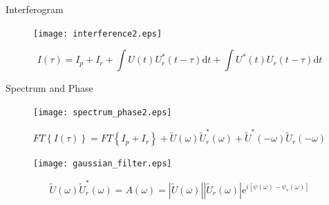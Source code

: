 \documentclass[11pt]{beamer}
\begin{document}
\begin{frame}{Interferogram}
\vspace{-15pt}
\begin{figure}
	\centering
	\texttt{[image: interference2.eps]}
\end{figure}
\vspace{-15pt}
\begin{equation*}
	I(\tau) 	= I_p + I_r + \int U(t)U_r^*(t-\tau)\mathrm{d}t + \int U^*(t)U_r(t-\tau)\mathrm{d}t 
\end{equation*}
\end{frame}

\begin{frame}{Spectrum and Phase}
\vspace{-15pt}
\begin{figure}
	\centering
	\texttt{[image: spectrum\_phase2.eps]}
\end{figure}
\vspace{-5pt}
\begin{equation*}
FT\left\lbrace I(\tau)\right\rbrace 	= 	FT\left\lbrace I_p + I_r \right\rbrace 
+ \tilde{U}(\omega)\tilde{U}_r^*(\omega) + \tilde{U}^*(-\omega)\tilde{U}_r(-\omega)
\end{equation*}
\end{frame}



\begin{frame}
\begin{figure}
	\texttt{[image: gaussian\_filter.eps]}
\end{figure}
\begin{equation}
\tilde{U}(\omega)\tilde{U}_r^*(\omega) = A(\omega) = |\tilde{U}(\omega)||\tilde{U}_r(\omega)|\mathrm{e}^{i[\psi(\omega)-\psi_r(\omega)]}
	\label{eq_gauss}
\end{equation}
\end{frame}
\end{document}
